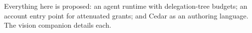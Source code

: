Everything here is proposed: an agent runtime with delegation-tree budgets; an
account entry point for attenuated grants; and Cedar as an authoring language. The
vision companion details each.
